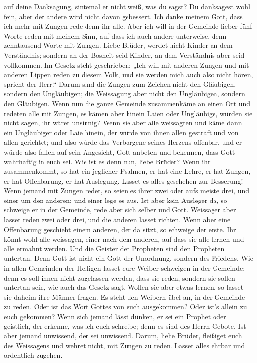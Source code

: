 auf deine Danksagung, sintemal er nicht weiß, was du sagst?
 Du danksagest wohl fein, aber der andere wird nicht
davon gebessert.  Ich danke meinem Gott, dass ich mehr
mit Zungen rede denn ihr alle.  Aber ich will in der
Gemeinde lieber fünf Worte reden mit meinem Sinn, auf dass ich auch
andere unterweise, denn zehntausend Worte mit Zungen. 
Liebe Brüder, werdet nicht Kinder an dem Verständnis; sondern an der
Bosheit seid Kinder, an dem Verständnis aber seid vollkommen.
 Im Gesetz steht geschrieben: „Ich will mit anderen
Zungen und mit anderen Lippen reden zu diesem Volk, und sie werden mich
auch also nicht hören, spricht der Herr.``  Darum sind
die Zungen zum Zeichen nicht den Gläubigen, sondern den Ungläubigen; die
Weissagung aber nicht den Ungläubigen, sondern den Gläubigen.
 Wenn nun die ganze Gemeinde zusammenkäme an einen Ort
und redeten alle mit Zungen, es kämen aber hinein Laien oder Ungläubige,
würden sie nicht sagen, ihr wäret unsinnig?  Wenn sie
aber alle weissagten und käme dann ein Ungläubiger oder Laie hinein, der
würde von ihnen allen gestraft und von allen gerichtet; 
und also würde das Verborgene seines Herzens offenbar, und er würde also
fallen auf sein Angesicht, Gott anbeten und bekennen, dass Gott
wahrhaftig in euch sei.  Wie ist es denn nun, liebe
Brüder? Wenn ihr zusammenkommt, so hat ein jeglicher Psalmen, er hat
eine Lehre, er hat Zungen, er hat Offenbarung, er hat Auslegung. Lasset
es alles geschehen zur Besserung!  Wenn jemand mit Zungen
redet, so seien es ihrer zwei oder aufs meiste drei, und einer um den
anderen; und einer lege es aus.  Ist aber kein Ausleger
da, so schweige er in der Gemeinde, rede aber sich selber und Gott.
 Weissager aber lasset reden zwei oder drei, und die
anderen lasset richten.  Wenn aber eine Offenbarung
geschieht einem anderen, der da sitzt, so schweige der erste.
 Ihr könnt wohl alle weissagen, einer nach dem anderen,
auf dass sie alle lernen und alle ermahnt werden.  Und
die Geister der Propheten sind den Propheten untertan. 
Denn Gott ist nicht ein Gott der Unordnung, sondern des Friedens.
 Wie in allen Gemeinden der Heiligen lasset eure Weiber
schweigen in der Gemeinde; denn es soll ihnen nicht zugelassen werden,
dass sie reden, sondern sie sollen untertan sein, wie auch das Gesetz
sagt.  Wollen sie aber etwas lernen, so lasset sie daheim
ihre Männer fragen. Es steht den Weibern übel an, in der Gemeinde zu
reden.  Oder ist das Wort Gottes von euch ausgekommen?
Oder ist's allein zu euch gekommen?  Wenn sich jemand
lässt dünken, er sei ein Prophet oder geistlich, der erkenne, was ich
euch schreibe; denn es sind des Herrn Gebote.  Ist aber
jemand unwissend, der sei unwissend.  Darum, liebe
Brüder, fleißiget euch des Weissagens und wehret nicht, mit Zungen zu
reden.  Lasset alles ehrbar und ordentlich zugehen.

